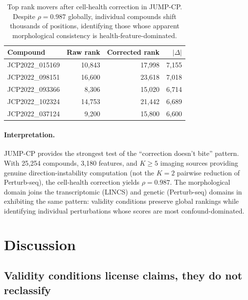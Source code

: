 \documentclass{article}
\begin{document}
\begin{table}[t]
\centering
\caption{Top rank movers after cell-health correction in JUMP-CP. Despite
$\rho = 0.987$ globally, individual compounds shift thousands of positions,
identifying those whose apparent morphological consistency is
health-feature-dominated.}
\label{tab:jump_movers}
\small
\begin{tabular}{lrrr}
\toprule
Compound & Raw rank & Corrected rank & $|\Delta|$ \\
\midrule
JCP2022\_015169 & 10{,}843 & 17{,}998 & 7{,}155 \\
JCP2022\_098151 & 16{,}600 & 23{,}618 & 7{,}018 \\
JCP2022\_093366 & 8{,}306 & 15{,}020 & 6{,}714 \\
JCP2022\_102324 & 14{,}753 & 21{,}442 & 6{,}689 \\
JCP2022\_037124 & 9{,}200 & 15{,}800 & 6{,}600 \\
\bottomrule
\end{tabular}
\end{table}

\paragraph{Interpretation.}
JUMP-CP provides the strongest test of the ``correction doesn't bite''
pattern. With 25{,}254 compounds, 3{,}180 features, and $K \geq 5$ imaging
sources providing genuine direction-instability computation (not the $K = 2$
pairwise reduction of Perturb-seq), the cell-health correction yields $\rho
= 0.987$. The morphological domain joins the transcriptomic (LINCS) and
genetic (Perturb-seq) domains in exhibiting the same pattern: validity
conditions preserve global rankings while identifying individual
perturbations whose scores are most confound-dominated.

\section{Discussion}

\subsection{Validity conditions license claims, they do not reclassify}
\end{document}
